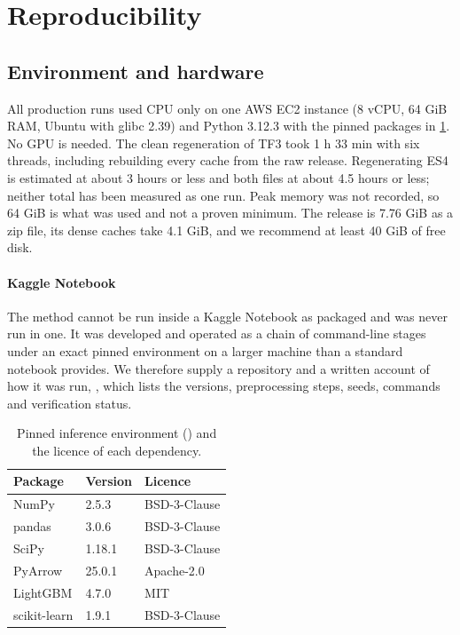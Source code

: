 \section{Reproducibility}\label{sec:repro}

\subsection{Environment and hardware}
All production runs used CPU only on one AWS EC2  instance (8 vCPU, 64 GiB RAM, Ubuntu with glibc
2.39) and Python 3.12.3 with the pinned packages in \cref{tab:env}. No GPU is needed. The clean regeneration of TF3
took 1 h 33 min with six threads, including rebuilding every cache from the raw release. Regenerating ES4 is estimated
at about 3 hours or less and both files at about 4.5 hours or less; neither total has been measured as one run. Peak
memory was not recorded, so 64 GiB is what was used and not a proven minimum. The release is 7.76 GiB as a zip file, its
dense caches take 4.1 GiB, and we recommend at least 40 GiB of free disk.

\paragraph{Kaggle Notebook} The method cannot be run inside a Kaggle Notebook as packaged and was never run in one. It
was developed and operated as a chain of command-line stages under an exact pinned environment on a larger machine than
a standard notebook provides. We therefore supply a repository and a written account of how it was run,
, which lists the versions, preprocessing steps, seeds, commands and verification status.

\begin{table}[h]
\centering\small
\caption{Pinned inference environment () and the licence of each dependency.}\label{tab:env}
\begin{tabular}{@{}l l l@{}}
\toprule
Package & Version & Licence \\
\midrule
NumPy \cite{harris2020} & 2.5.3 & BSD-3-Clause \\
pandas & 3.0.6 & BSD-3-Clause \\
SciPy \cite{virtanen2020} & 1.18.1 & BSD-3-Clause \\
PyArrow & 25.0.1 & Apache-2.0 \\
LightGBM \cite{ke2017} & 4.7.0 & MIT \\
scikit-learn & 1.9.1 & BSD-3-Clause \\
\bottomrule
\end{tabular}
\end{table}

